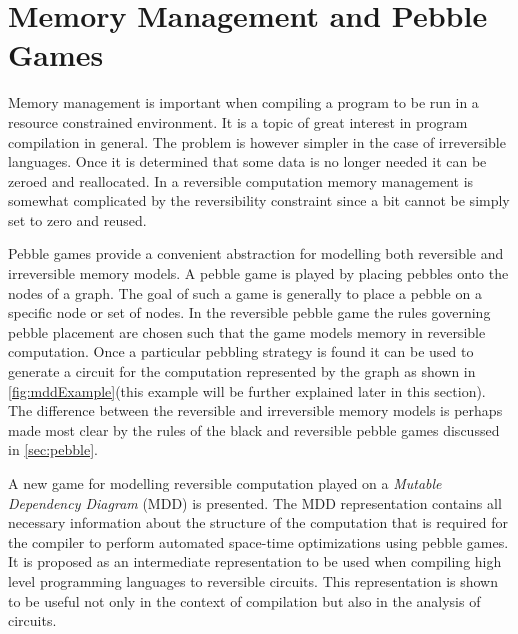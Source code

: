 \chapter{Memory Management and Pebble Games}

Memory management is important when compiling a program to be run in a resource
constrained environment. It is a topic of great interest in program compilation
in general. The problem is however simpler in the case of irreversible
languages. Once it is determined that some data is no longer needed it can be
zeroed and reallocated. In a reversible computation memory management is
somewhat complicated by the reversibility constraint since a bit cannot be
simply set to zero and reused\footnotemark.


Pebble games provide a convenient abstraction for modelling both reversible and
irreversible memory models. A pebble game is played by placing pebbles onto the
nodes of a graph. The goal of such a game is generally to place a pebble on a
specific node or set of nodes. In the reversible pebble game the rules
governing pebble placement are chosen such that the game models memory in
reversible computation. Once a particular pebbling strategy is found it can be
used to generate a circuit for the computation represented by the graph as
shown in \cref{fig:mddExample}(this example will be further explained later in
this section). The difference between the reversible and irreversible memory
models is perhaps made most clear by the rules of the black and reversible
pebble games discussed in \cref{sec:pebble}.

A new game for modelling reversible computation played on a \emph{Mutable
Dependency Diagram} (MDD) is presented. The MDD representation contains all
necessary information about the structure of the computation that is required
for the compiler to perform automated space-time optimizations using pebble
games. It is proposed as an intermediate representation to be used when
compiling high level programming languages to reversible circuits. This
representation is shown to be useful not only in the context of compilation but
also in the analysis of circuits.

